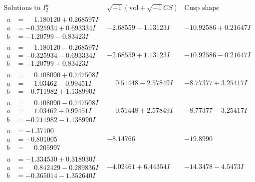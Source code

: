 \documentclass[1p]{elsarticle_modified}
\theoremstyle{definition}
\newcommand{\I}{\sqrt{-1}}
\begin{document}
$$\begin{array}{c|c|c}  
\text{Solutions to }I^u_{2}& \I (\text{vol} + \sqrt{-1}CS) & \text{Cusp shape}\\
 \hline 
\begin{aligned}
u &= \phantom{-}1.180120 + 0.268597 I \\
a &= -0.325934 + 0.693334 I \\
b &= -1.20799 - 0.83423 I\end{aligned}
 & -2.68559 - 1.13123 I & -10.92586 + 0.21647 I \\ \hline\begin{aligned}
u &= \phantom{-}1.180120 - 0.268597 I \\
a &= -0.325934 - 0.693334 I \\
b &= -1.20799 + 0.83423 I\end{aligned}
 & -2.68559 + 1.13123 I & -10.92586 - 0.21647 I \\ \hline\begin{aligned}
u &= \phantom{-}0.108090 + 0.747508 I \\
a &= \phantom{-}1.03462 - 0.99451 I \\
b &= -0.711982 + 1.138990 I\end{aligned}
 & \phantom{-}0.51448 - 2.57849 I & -8.77377 + 3.25417 I \\ \hline\begin{aligned}
u &= \phantom{-}0.108090 - 0.747508 I \\
a &= \phantom{-}1.03462 + 0.99451 I \\
b &= -0.711982 - 1.138990 I\end{aligned}
 & \phantom{-}0.51448 + 2.57849 I & -8.77377 - 3.25417 I \\ \hline\begin{aligned}
u &= -1.37100\phantom{ +0.000000I} \\
a &= -0.801005\phantom{ +0.000000I} \\
b &= \phantom{-}0.205997\phantom{ +0.000000I}\end{aligned}
 & -8.14766\phantom{ +0.000000I} & -19.8990\phantom{ +0.000000I} \\ \hline\begin{aligned}
u &= -1.334530 + 0.318930 I \\
a &= \phantom{-}0.842429 - 0.289836 I \\
b &= -0.365014 - 1.352640 I\end{aligned}
 & -4.02461 + 6.44354 I & -14.3478 - 4.5473 I \\ \hline\begin{aligned}

\end{aligned}
\end{array}$$
\end{document}
